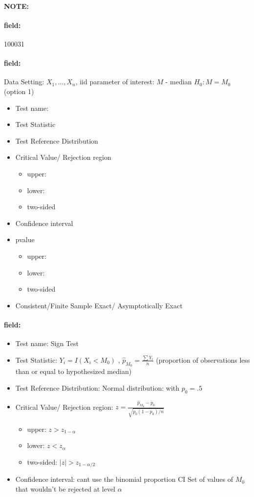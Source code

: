 \documentclass[12pt]{article}
\newenvironment{note}{\paragraph{NOTE:}}{}
\newenvironment{field}{\paragraph{field:}}{}
\begin{document}
\begin{note} \begin{field} \tiny 100031 \end{field}
 \begin{field}
  Data Setting: $X_1, \ldots, X_n$, iid parameter of interest: $M$ - median $H_0: M = M_0$ (option 1)
  \begin{itemize}
   \item Test name:
   \item Test Statistic
   \item Test Reference Distribution
   \item Critical Value/ Rejection region
         \begin{itemize}
          \item upper:
          \item lower:
          \item two-sided
         \end{itemize}
   \item Confidence interval
   \item pvalue
         \begin{itemize}
          \item upper:
          \item lower:
          \item two-sided
         \end{itemize}
   \item Consistent/Finite Sample Exact/ Asymptotically Exact
  \end{itemize}
 \end{field}
 \begin{field}
  \begin{itemize}
   \item Test name: Sign Test
   \item Test Statistic: $Y_i = I(X_i < M_0)$ , $\hat{p}_{M_0} = \frac{\sum Y_i}{n}$ (proportion of observations less than or equal to hypothesized median)
   \item Test Reference Distribution: Normal distribution: with $p_0 = .5$
   \item Critical Value/ Rejection region: $z = \frac{\hat{p}_{M_0} - p_0}{\sqrt{p_0(1-p_0)/n}}$
         \begin{itemize}
          \item upper: $z > z_{1-\alpha}$
          \item lower: $z < z_\alpha$
          \item two-sided: $|z| > z_{1-\alpha/2}$
         \end{itemize}
   \item Confidence interval: cant use the binomial proportion CI
         Set of values of $M_0$ that wouldn't be rejected at level $\alpha$


\end{itemize}
\end{field}
\end{note}
\end{document}

